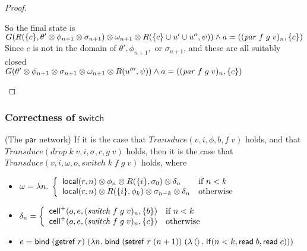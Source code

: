 \begin{proof}
\begin{tabbedproof}
\oo So the final state is \\
\oo $G(R(\{{c}\}, \theta' \otimes \phi_{n+1} \otimes \sigma_{n+1}) \otimes \omega_{n+1} \otimes R(\{{c}\} \cup u' \cup u'', \psi)) \land a = ((\mathit{par}\;f\;g\;v)_n, \{{c}\})$ \\
\oo Since $c$ is not in the domain of $\theta', \phi_{n+1},$ or $\sigma_{n+1}$, and these are all suitably closed\\
\oo $G(\theta' \otimes \phi_{n+1} \otimes \sigma_{n+1} \otimes \omega_{n+1} \otimes R(u''', \psi)) \land a = ((\mathit{par}\;f\;g\;v)_n, \{{c}\})$ \\
\end{tabbedproof}
\end{proof}

\subsubsection{Correctness of $\mathsf{switch}$}

\begin{lemma}{(The $\mathsf{par}$ network)}
If it is the case that $\mathit{Transduce}(v, i, \phi, b,f\;v)$ holds, and that 
$\mathit{Transduce}(\mathit{drop}\;k\;v, i, \sigma, c, g\;v)$ holds,
then it is the case that $\mathit{Transduce}(v, i, \omega, o,
\mathit{switch}\;k\;f\;g\;v)$ holds, where

\begin{itemize}
\item $\omega = \lambda n.\;\left\{\begin{array}{ll}
                                    \mathsf{local}({r}, {n}) \otimes \phi_n \otimes R(\{{i}\}, \sigma_0) \otimes \delta_n 
                                    & \mbox{if } n < k \\
                                    \mathsf{local}({r}, {n}) \otimes R(\{{i}\}, \phi_k) \otimes \sigma_{n-k} \otimes \delta_n 
                                    & \mbox{otherwise} \\
                                   \end{array}\right.$
\item $\delta_n = \left\{\begin{array}{ll}
                          \mathsf{cell}^{+}({o}, {e}, {(\mathit{switch}\;f\;g\;v)_n}, {\{{b}\}}) & \mbox{if } n < k\\
                          \mathsf{cell}^{+}({o}, {e}, {(\mathit{switch}\;f\;g\;v)_n}, {\{{c}\}}) & \mbox{otherwise} \\
                         \end{array}
                 \right.$
\item $e = \mathsf{bind}\; (\mathsf{getref}\; r)\; (\lambda n.\;\mathsf{bind}\; (\mathsf{setref}\; r\;(n+1))\; (\lambda \left<\right>.\;\mathsf{if}({n < k}, {\mathsf{read}\; b}, {\mathsf{read}\; c})))$
           

\end{itemize}
\end{lemma}

